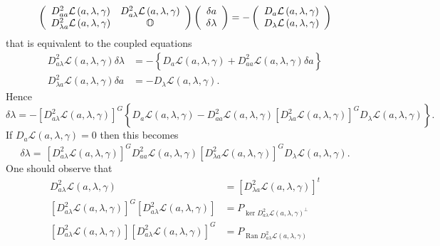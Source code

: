 \documentclass[aps,preprint]{revtex4}%
\begin{document}
\begin{equation}
\left(
\begin{array}
[c]{cc}%
D_{aa}^{2}\mathcal{L}\left(  a,\lambda,\gamma\right)  & D_{a\lambda}%
^{2}\mathcal{L}\left(  a,\lambda,\gamma\right) \\
D_{\lambda a}^{2}\mathcal{L}\left(  a,\lambda,\gamma\right)  & \mathbb{O}%
\end{array}
\right)  \left(
\begin{array}
[c]{c}%
\delta a\\
\delta\lambda
\end{array}
\right)  =-\left(
\begin{array}
[c]{c}%
D_{a}\mathcal{L}\left(  a,\lambda,\gamma\right) \\
D_{\lambda}\mathcal{L}\left(  a,\lambda,\gamma\right)
\end{array}
\right)  \label{ME1}%
\end{equation}
that is equivalent to the coupled equations
\begin{align}
D_{a\lambda}^{2}\mathcal{L}\left(  a,\lambda,\gamma\right)  \delta\lambda &
=-\left\{  \overset{}{D_{a}\mathcal{L}\left(  a,\lambda,\gamma\right)
+D_{aa}^{2}\mathcal{L}\left(  a,\lambda,\gamma\right)  \delta a}\right\}
\label{x1eq}\\
D_{\lambda a}^{2}\mathcal{L}\left(  a,\lambda,\gamma\right)  \delta a  &
=-D_{\lambda}\mathcal{L}\left(  a,\lambda,\gamma\right)  .
\end{align}
Hence
\begin{equation}
\delta\lambda=-\left[  D_{a\lambda}^{2}\mathcal{L}\left(  a,\lambda
,\gamma\right)  \right]  ^{G}\left\{  \overset{}{D_{a}\mathcal{L}\left(
a,\lambda,\gamma\right)  -D_{aa}^{2}\mathcal{L}\left(  a,\lambda
,\gamma\right)  \left[  D_{\lambda a}^{2}\mathcal{L}\left(  a,\lambda
,\gamma\right)  \right]  ^{G}D_{\lambda}\mathcal{L}\left(  a,\lambda
,\gamma\right)  }\right\}  .
\end{equation}
If $D_{a}\mathcal{L}\left(  a,\lambda,\gamma\right)  =0$ then this becomes
\begin{equation}
\delta\lambda=\,\overset{}{\left[  D_{a\lambda}^{2}\mathcal{L}\left(
a,\lambda,\gamma\right)  \right]  ^{G}D_{aa}^{2}\mathcal{L}\left(
a,\lambda,\gamma\right)  \left[  D_{\lambda a}^{2}\mathcal{L}\left(
a,\lambda,\gamma\right)  \right]  ^{G}D_{\lambda}\mathcal{L}\left(
a,\lambda,\gamma\right)  }.
\end{equation}
One should observe that
\begin{align}
D_{a\lambda}^{2}\mathcal{L}\left(  a,\lambda,\gamma\right)   &  =\left[
D_{\lambda a}^{2}\mathcal{L}\left(  a,\lambda,\gamma\right)  \right]  ^{t}\\
\left[  D_{a\lambda}^{2}\mathcal{L}\left(  a,\lambda,\gamma\right)  \right]
^{G}\left[  D_{a\lambda}^{2}\mathcal{L}\left(  a,\lambda,\gamma\right)
\right]   &  =P_{\ker D_{a\lambda}^{2}\mathcal{L}\left(  a,\lambda
,\gamma\right)  ^{\bot}}\\
\left[  D_{a\lambda}^{2}\mathcal{L}\left(  a,\lambda,\gamma\right)  \right]
\left[  D_{a\lambda}^{2}\mathcal{L}\left(  a,\lambda,\gamma\right)  \right]
^{G}  &  =P_{\operatorname{Ran}D_{a\lambda}^{2}\mathcal{L}\left(
a,\lambda,\gamma\right)  }%
\end{align}
\end{document}
